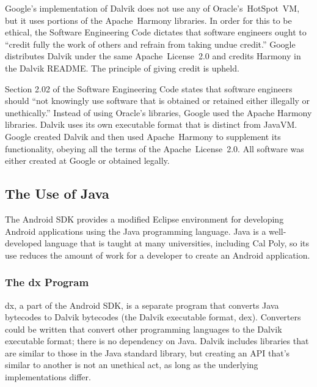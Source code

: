 \documentclass[11pt]{article}
\begin{document}
\begin{multicols}{2}
Google's implementation of Dalvik does not use any of Oracle's~HotSpot~VM, but
it uses portions of the Apache~Harmony libraries.  In order for this to be
ethical, the Software Engineering Code dictates that software engineers ought to
``credit fully the work of others and refrain from taking undue credit.''
\cite[\S 7.03]{secode}  Google distributes Dalvik under the same
Apache~License~2.0 and credits Harmony in the Dalvik README.
\cite{dalvik-readme}  The principle of giving credit is upheld.

Section 2.02 of the Software Engineering Code states that software engineers
should ``not knowingly use software that is obtained or retained either
illegally or unethically.'' \cite[\S 2.02]{secode}  Instead of using Oracle's
libraries, Google used the Apache Harmony libraries.  Dalvik uses its own
executable format that is distinct from JavaVM.  Google created Dalvik and then
used Apache~Harmony to supplement its functionality, obeying all the terms of
the Apache~License~2.0.  All software was either created at Google or obtained
legally.


\subsection{The Use of Java} %
\label{sub:java}

The Android SDK provides a modified Eclipse environment for developing Android
applications using the Java programming language.  Java is a well-developed
language that is taught at many universities, including Cal Poly, so its use
reduces the amount of work for a developer to create an Android application.

\subsubsection{The dx Program} %
\label{ssub:dex}

dx, a part of the Android SDK, is a separate program that converts Java
bytecodes to Dalvik bytecodes (the Dalvik executable format, dex).  Converters
could be written that convert other programming languages to the Dalvik
executable format; there is no dependency on Java.  Dalvik includes libraries
that are similar to those in the Java standard library, but creating an API
that's similar to another is not an unethical act, as long as the underlying
implementations differ.



\end{multicols}
\end{document}
